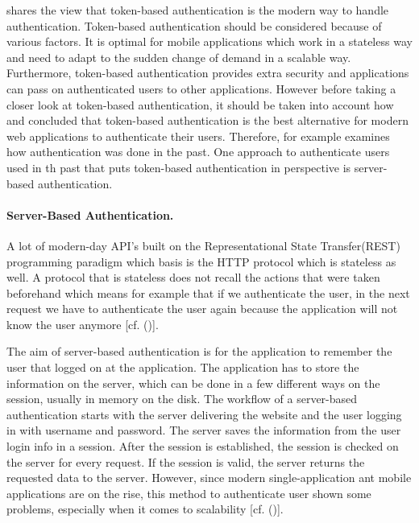 {\cite{Serilleja:2015:Scothio} shares the view that token-based authentication is the modern way to handle authentication. Token-based authentication should be considered because of various factors. It is optimal for mobile applications which work in a stateless way and need to adapt to the sudden change of demand in a scalable way. Furthermore, token-based authentication provides extra security and applications can pass on authenticated users to other applications. However before taking a closer look at token-based authentication, it should be taken into account how \cite{Serilleja:2015:Scothio} and \cite{Tkalec:2015} concluded that token-based authentication is the best alternative for modern web applications to authenticate their users. Therefore, \cite{Serilleja:2015:Scothio} for example examines how authentication was done in the past. One approach to authenticate users used in th past that puts token-based authentication in perspective is server-based authentication. 

\paragraph{Server-Based Authentication.}
A lot of modern-day API’s built on the Representational State Transfer(REST) programming paradigm which basis is the HTTP protocol which is stateless as well. A protocol that is stateless does not recall the actions that were taken beforehand which means for example that if we authenticate the user, in the next request we have to authenticate the user again because the application will not know the user anymore [cf. (\cite{Serilleja:2015:Scothio})]. 

The aim of server-based authentication is for the application to remember the user that logged on at the application. The application has to store the information on the server, which can be done in a few different ways on the session, usually in memory on the disk. The workflow of a server-based authentication starts with the server delivering the website and the user logging in with username and password. The server saves the information from the user login info in a session. After the session is established, the session is checked on the server for every request. If the session is valid, the server returns the requested data to the server. However, since modern single-application ant mobile applications are on the rise, this method to authenticate user shown some problems, especially when it comes to scalability [cf. (\cite{Serilleja:2015:Scothio})]. 

}
